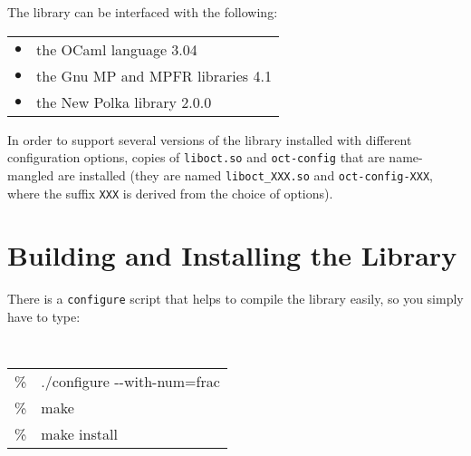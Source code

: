 \documentclass[twosides]{report}
\begin{document}
\bigskip

\noindent
The library can be interfaced with the following:\\
\begin{tabular}{ll}
$\bullet$ & the OCaml language 3.04 \cite{OCaml}\\
$\bullet$ & the Gnu MP and MPFR libraries 4.1 \cite{GMP,MPFR,MLGMP}\\
$\bullet$ & the New Polka library 2.0.0 \cite{polka}\\
\end{tabular}

\bigskip

\noindent
In order to support several versions of the library installed with different
configuration options, copies of {\tt liboct.so} and {\tt oct-config} that are
name-mangled are installed (they are named {\tt liboct\_XXX.so} and 
{\tt oct-config-XXX}, where the suffix {\tt XXX} is derived from the choice
of options).

\section{Building and Installing the Library}

There is a {\tt configure} script that helps to compile the library easily,
so you simply have to type:

\hspace*{0.2cm}

{\tt
\begin{tabular}{ll}
\%\quad&./configure -{}-with-num=frac\\
\%&make\\
\%&make install
\end{tabular}
}

\hspace*{0.2cm}
\end{document}
